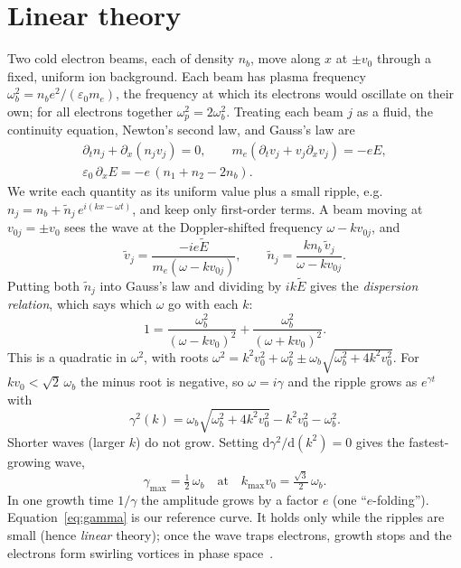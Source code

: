 \documentclass[10pt,twocolumn,letterpaper]{article}
\newcommand{\wb}{\omega_b}            %
\newcommand{\wpe}{\omega_{p}}         %
\newcommand{\vz}{v_0}                 %
\newcommand{\dd}{\mathrm{d}}
\begin{document}
\section{Linear theory}
\label{sec:theory}

Two cold electron beams, each of density $n_b$, move along $x$ at $\pm\vz$ through a fixed,
uniform ion background. Each beam has plasma frequency $\wb^2 = n_b e^2/(\varepsilon_0 m_e)$,
the frequency at which its electrons would oscillate on their own; for all electrons together
$\wpe^2=2\wb^2$. Treating each beam $j$ as a fluid, the continuity equation, Newton's second law,
and Gauss's law are
\begin{gather}
  \partial_t n_j + \partial_x (n_j v_j) = 0, \qquad
  m_e(\partial_t v_j + v_j\partial_x v_j) = -eE, \nonumber\\
  \varepsilon_0\,\partial_x E = -e\,(n_1 + n_2 - 2n_b).
\end{gather}
We write each quantity as its uniform value plus a small ripple, e.g.\
$n_j = n_b + \tilde n_j\, e^{i(kx-\omega t)}$, and keep only first-order terms. A beam moving
at $v_{0j}=\pm\vz$ sees the wave at the Doppler-shifted frequency $\omega - k v_{0j}$, and
\begin{equation}
  \tilde v_j = \frac{-ie\tilde E}{m_e(\omega - k v_{0j})}, \qquad
  \tilde n_j = \frac{k n_b\,\tilde v_j}{\omega - k v_{0j}}.
\end{equation}
Putting both $\tilde n_j$ into Gauss's law and dividing by $ik\tilde E$ gives the
\emph{dispersion relation}, which says which $\omega$ go with each $k$:
\begin{equation}
  1 = \frac{\wb^2}{(\omega - k\vz)^2} + \frac{\wb^2}{(\omega + k\vz)^2}.
  \label{eq:disp}
\end{equation}
This is a quadratic in $\omega^2$, with roots
$\omega^2 = k^2\vz^2 + \wb^2 \pm \wb\sqrt{\wb^2 + 4k^2\vz^2}$. For $k\vz<\sqrt2\,\wb$ the minus
root is negative, so $\omega = i\gamma$ and the ripple grows as $e^{\gamma t}$ with
\begin{equation}
  \gamma^2(k) = \wb\sqrt{\wb^2 + 4k^2\vz^2} - k^2\vz^2 - \wb^2 .
  \label{eq:gamma}
\end{equation}
Shorter waves (larger $k$) do not grow. Setting $\dd\gamma^2/\dd(k^2)=0$ gives the
fastest-growing wave,
\begin{equation}
  \gamma_{\max} = \tfrac{1}{2}\,\wb \quad\text{at}\quad k_{\max}\vz = \tfrac{\sqrt{3}}{2}\,\wb .
  \label{eq:gmax}
\end{equation}
In one growth time $1/\gamma$ the amplitude grows by a factor $e$ (one ``$e$-folding'').
Equation~\eqref{eq:gamma} is our reference curve. It holds only while the ripples are small
(hence \emph{linear} theory); once the wave traps electrons, growth stops and the electrons
form swirling vortices in phase space~\citep{BirdsallLangdon1991}.
\end{document}
